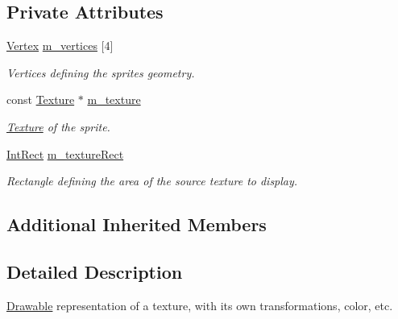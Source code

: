 \subsection*{Private Attributes}
\begin{DoxyCompactItemize}
\item 
\mbox{\label{classsf_1_1_sprite_a9ff05db1e34fb6734105a6e0fc6ab4e8}} 
\mbox{\hyperlink{classsf_1_1_vertex}{Vertex}} \mbox{\hyperlink{classsf_1_1_sprite_a9ff05db1e34fb6734105a6e0fc6ab4e8}{m\+\_\+vertices}} \mbox{[}4\mbox{]}
\begin{DoxyCompactList}\small\item\em Vertices defining the sprite\textquotesingle{}s geometry. \end{DoxyCompactList}\item 
\mbox{\label{classsf_1_1_sprite_a6b01024205458042395d62f38c88ea86}} 
const \mbox{\hyperlink{classsf_1_1_texture}{Texture}} $\ast$ \mbox{\hyperlink{classsf_1_1_sprite_a6b01024205458042395d62f38c88ea86}{m\+\_\+texture}}
\begin{DoxyCompactList}\small\item\em \mbox{\hyperlink{classsf_1_1_texture}{Texture}} of the sprite. \end{DoxyCompactList}\item 
\mbox{\label{classsf_1_1_sprite_ab944868894cfac8bfeed1b06a3295876}} 
\mbox{\hyperlink{classsf_1_1_rect}{Int\+Rect}} \mbox{\hyperlink{classsf_1_1_sprite_ab944868894cfac8bfeed1b06a3295876}{m\+\_\+texture\+Rect}}
\begin{DoxyCompactList}\small\item\em Rectangle defining the area of the source texture to display. \end{DoxyCompactList}\end{DoxyCompactItemize}
\subsection*{Additional Inherited Members}


\subsection{Detailed Description}
\mbox{\hyperlink{classsf_1_1_drawable}{Drawable}} representation of a texture, with its own transformations, color, etc. 


